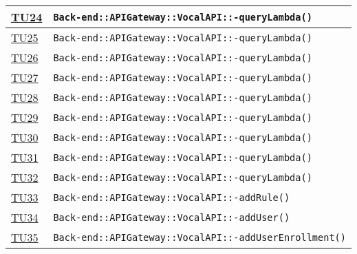 \begin{longtable}{|>{\centering}m{1cm}|m{12cm}<{\centering}|}
\hyperlink{TU24}{TU24} & \texttt{Back-end::APIGateway::VocalAPI::-\linebreak queryLambda()}\\ \hline

\hyperlink{TU25}{TU25} & \texttt{Back-end::APIGateway::VocalAPI::-\linebreak queryLambda()}\\ \hline

\hyperlink{TU26}{TU26} & \texttt{Back-end::APIGateway::VocalAPI::-\linebreak queryLambda()}\\ \hline

\hyperlink{TU27}{TU27} & \texttt{Back-end::APIGateway::VocalAPI::-\linebreak queryLambda()}\\ \hline

\hyperlink{TU28}{TU28} & \texttt{Back-end::APIGateway::VocalAPI::-\linebreak queryLambda()}\\ \hline

\hyperlink{TU29}{TU29} & \texttt{Back-end::APIGateway::VocalAPI::-\linebreak queryLambda()}\\ \hline

\hyperlink{TU30}{TU30} & \texttt{Back-end::APIGateway::VocalAPI::-\linebreak queryLambda()}\\ \hline

\hyperlink{TU31}{TU31} & \texttt{Back-end::APIGateway::VocalAPI::-\linebreak queryLambda()}\\ \hline

\hyperlink{TU32}{TU32} & \texttt{Back-end::APIGateway::VocalAPI::-\linebreak queryLambda()}\\ \hline

\hyperlink{TU33}{TU33} & \texttt{Back-end::APIGateway::VocalAPI::-\linebreak addRule()}\\ \hline

\hyperlink{TU34}{TU34} & \texttt{Back-end::APIGateway::VocalAPI::-\linebreak addUser()}\\ \hline

\hyperlink{TU35}{TU35} & \texttt{Back-end::APIGateway::VocalAPI::-\linebreak addUserEnrollment()}\\ \hline


\end{longtable}
